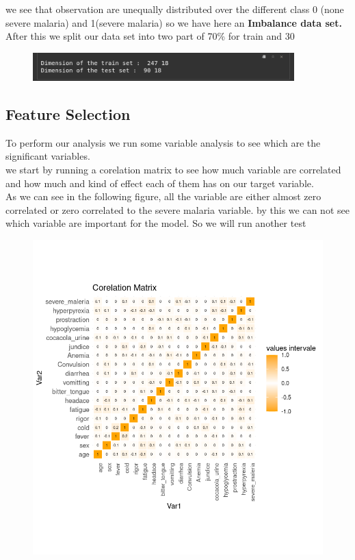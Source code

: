 \documentclass[12pt,a4paper]{article}
\begin{document}
we see that observation are unequally distributed over the different class 0 (none severe malaria) and 1(severe malaria) so we have here an \textbf{Imbalance data set.}\\
After this we split our data set into two part of 70\% for train and 30%
\begin{figure}[H]
	\centering
	\includegraphics[width=0.9\textwidth, height=0.07\textheight]{Figures/dataspliting.png}
	\label{fig:code}
\end{figure}

\subsection{Feature Selection}
To perform our analysis we run some variable analysis to see which are the significant variables.\\
we start by running a corelation matrix to see how much variable are correlated and how much and kind of effect each of them has on our target variable.\\
As we can see in the following figure,  all the variable are either almost zero correlated or zero correlated to the severe malaria variable. by this we can not see which variable are important for the model. So we will run another test
\begin{figure}[H]
	\centering
	\includegraphics[width=1\textwidth, height=0.6\textheight]{Figures/corMatrix.png}
	\label{fig:code}
\end{figure}
\end{document}
